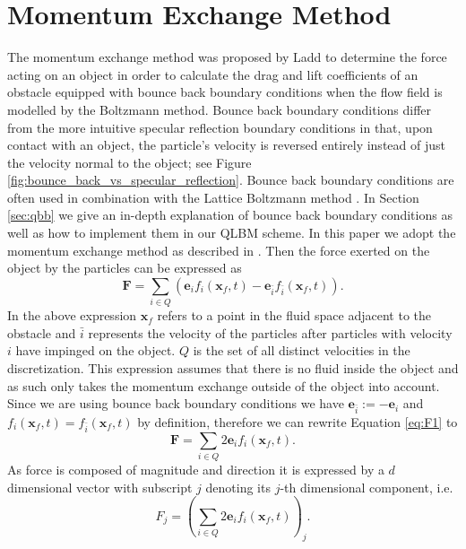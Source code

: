 \section{Momentum Exchange Method}\label{sec:MEM}
The momentum exchange method was proposed by Ladd \cite{Ladd1994} to determine the force acting on an object in order to calculate the drag and lift coefficients of an obstacle equipped with bounce back boundary conditions when the flow field is modelled by the Boltzmann method. Bounce back boundary conditions differ from the more intuitive specular reflection boundary conditions in that, upon contact with an object, the particle's velocity is reversed entirely instead of just the velocity normal to the object; see Figure \ref{fig:bounce_back_vs_specular_reflection}. Bounce back boundary conditions are often used in combination with the Lattice Boltzmann method \cite{Kruger2017}. In Section \ref{sec:qbb} we give an in-depth explanation of bounce back boundary conditions as well as how to implement them in our QLBM scheme.
In this paper we adopt the momentum exchange method as described in \cite{Kruger2017}. Then the force exerted on the object by the particles can be expressed as
\begin{equation}\label{eq:F1}
    \mathbf{F} = \sum_{i\in Q} \left ( \mathbf{e}_{i}f_i(\mathbf{x}_f,t) - \mathbf{e}_{\bar{i}} f_{\bar{i}}(\mathbf{x}_f,t) \right ) .
\end{equation}
In the above expression $\mathbf{x}_f$ refers to a point in the fluid space adjacent to the obstacle and $\bar{i}$ represents the velocity of the particles after particles with velocity $i$ have impinged on the object.
$Q$ is the set of all distinct velocities in the discretization.
This expression assumes that there is no fluid inside the object and as such only takes the momentum exchange outside of the object into account. Since we are using bounce back boundary conditions we have $\mathbf{e}_{\bar{i}}:=-\mathbf{e}_i$ and
$f_i(\mathbf{x}_f,t) = f_{\bar{i}}(\mathbf{x}_f,t)$ by definition, therefore we can rewrite Equation \eqref{eq:F1} to 
\begin{equation}\label{eq:F2}
    \mathbf{F} = \sum_{i\in Q} 2 \mathbf{e}_{i} f_i(\mathbf{x}_f,t).
\end{equation}
As force is composed of magnitude and direction it is expressed by a $d$ dimensional vector with subscript $j$ denoting its $j$-th dimensional component, i.e.
\begin{equation}\label{eq:F2_d}
    F_j = \left ( \sum_{i\in Q} 2 \mathbf{e}_{i} f_i(\mathbf{x}_f,t) \right )_j.
\end{equation}